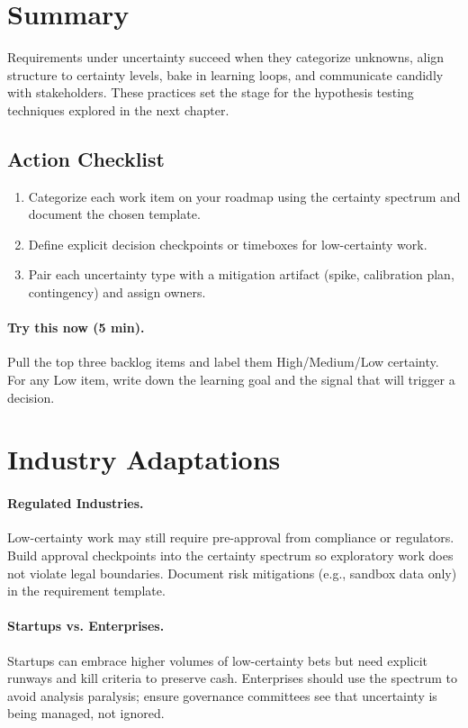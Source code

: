 \section{Summary}
\label{sec:uncertainty-summary}

Requirements under uncertainty succeed when they categorize unknowns, align structure to certainty levels, bake in learning loops, and communicate candidly with stakeholders. These practices set the stage for the hypothesis testing techniques explored in the next chapter.

\subsection{Action Checklist}
\begin{enumerate}
    \item Categorize each work item on your roadmap using the certainty spectrum and document the chosen template.
    \item Define explicit decision checkpoints or timeboxes for low-certainty work.
    \item Pair each uncertainty type with a mitigation artifact (spike, calibration plan, contingency) and assign owners.
\end{enumerate}

\paragraph{Try this now (5 min).} Pull the top three backlog items and label them High/Medium/Low certainty. For any Low item, write down the learning goal and the signal that will trigger a decision.

\section{Industry Adaptations}
\label{sec:uncertainty-adaptations}
\paragraph{Regulated Industries.} Low-certainty work may still require pre-approval from compliance or regulators. Build approval checkpoints into the certainty spectrum so exploratory work does not violate legal boundaries. Document risk mitigations (e.g., sandbox data only) in the requirement template.

\paragraph{Startups vs. Enterprises.} Startups can embrace higher volumes of low-certainty bets but need explicit runways and kill criteria to preserve cash. Enterprises should use the spectrum to avoid analysis paralysis; ensure governance committees see that uncertainty is being managed, not ignored.

